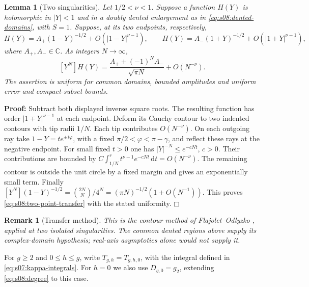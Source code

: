 \documentclass[a4paper,10pt]{article}
\numberwithin{equation}{section}
\newcommand{\dd}{\mathrm{d}}
\theoremstyle{paperplain}
\newtheorem{lmm}[thm]{Lemma}
\theoremstyle{paperremark}
\newtheorem{rmk}{Remark}[section]
\theoremstyle{paperplain}
\newenvironment{prf}{\noindent \textbf{Proof: }}{\hfill $\mdlgwhtsquare$\par\addvspace{0.5\baselineskip}}
\begin{document}
\begin{lmm}[Two singularities]\label{lmm:s08:transfer}
Let $1/2<\nu<1$. Suppose a function $H(Y)$ is holomorphic in
$|Y|<1$ and in a doubly dented enlargement as in
\eqref{eq:s08:dented-domains}, with $S=1$. Suppose, at its two
endpoints, respectively,
\[
 H(Y)=A_+(1-Y)^{-1/2}+O(|1-Y|^{\nu-1}),\qquad
 H(Y)=A_-(1+Y)^{-1/2}+O(|1+Y|^{\nu-1}),
\]
where $A_+,A_-\in\mathbb C$. As integers $N\to\infty$,
\begin{equation}\label{eq:s08:two-point-transfer}
 [Y^N]H(Y)=\frac{A_++(-1)^NA_-}{\sqrt{\pi N}}
                                     +O(N^{-\nu}).
\end{equation}
The assertion is uniform for common domains, bounded amplitudes
and uniform error and compact-subset bounds.
\end{lmm}
\begin{prf}
Subtract both displayed inverse square roots. The resulting function
has order $|1\mp Y|^{\nu-1}$ at each endpoint. Deform its Cauchy
contour to two indented contours with tip radii $1/N$. Each tip
contributes $O(N^{-\nu})$. On each outgoing ray take
$1-Y=t e^{\pm i\varphi}$, with a fixed
$\pi/2<\varphi<\pi-\gamma$, and reflect these rays at the
negative endpoint. For small fixed $t>0$ one has
$|Y|^{-N}\leq e^{-cNt}$, $c>0$. Their contributions are bounded by
$C\int_{1/N}^{r}t^{\nu-1}e^{-cNt}\,\dd t=O(N^{-\nu})$.
The remaining contour is outside the unit circle by a fixed margin
and gives an exponentially small term. Finally
$[Y^N](1-Y)^{-1/2}=\binom{2N}{N}/4^N
=(\pi N)^{-1/2}(1+O(N^{-1}))$.
This proves \eqref{eq:s08:two-point-transfer} with the stated
uniformity.
\end{prf}

\begin{rmk}[Transfer method]
This is the contour method of Flajolet--Odlyzko
\cite[\S 2]{FO90}, applied at two isolated singularities. The common
dented regions above supply its complex-domain hypothesis; real-axis
asymptotics alone would not supply it.
\end{rmk}

For $g\geq2$ and $0\leq h\leq g$, write
$T_{g,h}=T_{g,h,0}$, with the integral defined in
\eqref{eq:s07:kappa-integrals}. For $h=0$ we also use
$D_{g,0}=g_2$, extending \eqref{eq:s08:degree} to this case.
\end{document}
